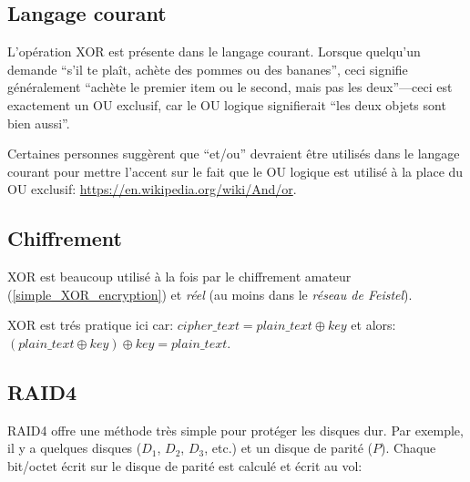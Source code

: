 ﻿
\label{XOR_property}






\subsection{Langage courant}

L'opération XOR est présente dans le langage courant.
Lorsque quelqu'un demande ``s'il te plaît, achète des pommes ou des bananes'', ceci
signifie généralement ``achète le premier item ou le second, mais pas les deux''---ceci
est exactement un OU exclusif, car le OU logique signifierait ``les deux objets sont bien aussi''.

Certaines personnes suggèrent que ``et/ou'' devraient être utilisés dans le langage
courant pour mettre l'accent sur le fait que le OU logique est utilisé à la place
du OU exclusif: \url{https://en.wikipedia.org/wiki/And/or}.

\subsection{Chiffrement}

XOR est beaucoup utilisé à la fois par le chiffrement amateur (\ref{simple_XOR_encryption})
et \emph{réel} (au moins dans le \emph{réseau de Feistel}).

XOR est trés pratique ici car:
$cipher\_text = plain\_text \oplus key$ et alors:
$(plain\_text \oplus key) \oplus key = plain\_text$.

\subsection{\ac{RAID}4}

\ac{RAID}4 offre une méthode très simple pour protéger les disques dur.
Par exemple, il y a quelques disques ($D_1$, $D_2$, $D_3$, etc.) et un disque de
parité ($P$).
Chaque bit/octet écrit sur le disque de parité est calculé et écrit au vol:

